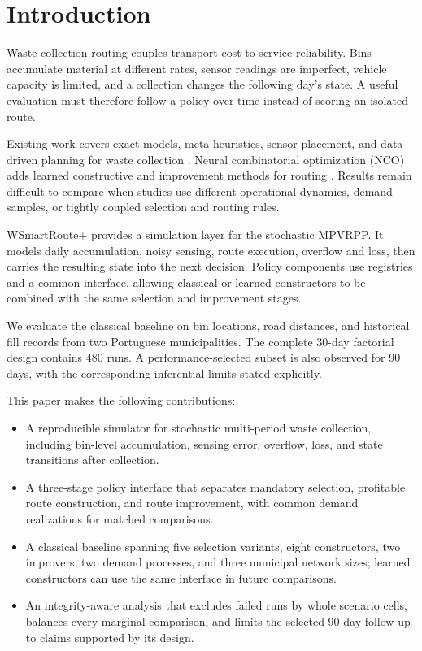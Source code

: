 \documentclass[orivec,runningheads]{llncs}
\begin{document}
\section{Introduction}

Waste collection routing couples transport cost to service reliability. Bins
accumulate material at different rates, sensor readings are imperfect, vehicle
capacity is limited, and a collection changes the following day's state. A
useful evaluation must therefore follow a policy over time instead of scoring an
isolated route.

Existing work covers exact models, meta-heuristics, sensor placement, and
data-driven planning for waste collection
\cite{hess2024waste,jorge2022hybrid,lopes2023efficient,de2024data}. Neural
combinatorial optimization (NCO) adds learned constructive and improvement
methods for routing \cite{wu2024neural}. Results remain difficult to compare
when studies use different operational dynamics, demand samples, or tightly
coupled selection and routing rules.

WSmartRoute+ provides a simulation layer for the stochastic MPVRPP. It
models daily accumulation, noisy sensing, route execution, overflow and loss,
then carries the resulting state into the next decision. Policy components use
registries and a common interface, allowing classical or learned constructors
to be combined with the same selection and improvement stages.

We evaluate the classical baseline on bin locations, road distances, and
historical fill records from two Portuguese municipalities. The complete
30-day factorial design contains 480 runs. A performance-selected subset is
also observed for 90 days, with the corresponding inferential limits stated
explicitly.

This paper makes the following contributions:

\begin{itemize}
    \item A reproducible simulator for stochastic multi-period waste collection,
    including bin-level accumulation, sensing error, overflow, loss, and state
    transitions after collection.
    
    \item A three-stage policy interface that separates mandatory selection,
    profitable route construction, and route improvement, with common demand
    realizations for matched comparisons.
    
    \item A classical baseline spanning five selection variants, eight
    constructors, two improvers, two demand processes, and three municipal
    network sizes; learned constructors can use the same interface in future
    comparisons.
    
    \item An integrity-aware analysis that excludes failed runs by whole
    scenario cells, balances every marginal comparison, and limits the selected
    90-day follow-up to claims supported by its design.
\end{itemize}
\end{document}

